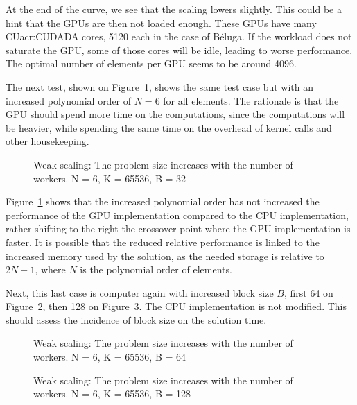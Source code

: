 At the end of the curve, we see that the scaling lowers slightly. This could be a hint that the GPUs
are then not loaded enough. These GPUs have many CU\acrshort{acr:CUDA}DA cores, 5120 each in the
case of Béluga. If the workload does not saturate the GPU, some of those cores will be idle, leading
to worse performance. The optimal number of elements per GPU seems to be around 4096.

The next test, shown on Figure~\ref{fig:strong_scaling_N6_W32}, shows the same test case but with an
increased polynomial order of $N = 6$ for all elements. The rationale is that the GPU should spend
more time on the computations, since the computations will be heavier, while spending the same time
on the overhead of kernel calls and other housekeeping.

\begin{figure}[H]
	\centering
	
	\caption{Weak scaling: The problem size increases with the number of workers. N = 6, K = 65536, B = 32}
	\label{fig:strong_scaling_N6_W32}
\end{figure}

Figure~\ref{fig:strong_scaling_N6_W32} shows that the increased polynomial order has not increased
the performance of the GPU implementation compared to the CPU implementation, rather shifting to the
right the crossover point where the GPU implementation is faster. It is possible that the reduced
relative performance is linked to the increased memory used by the solution, as the needed storage
is relative to $2 N + 1$, where $N$ is the polynomial order of elements.

Next, this last case is computer again with increased block size $B$, first 64 on
Figure~\ref{fig:strong_scaling_N6_W64}, then 128 on Figure~\ref{fig:strong_scaling_N6_W128}. The CPU
implementation is not modified. This should assess the incidence of block size on the solution time.

\begin{figure}[H]
	\centering
	
	\caption{Weak scaling: The problem size increases with the number of workers. N = 6, K = 65536, B = 64}
	\label{fig:strong_scaling_N6_W64}
\end{figure}

\begin{figure}[H]
	\centering
	
	\caption{Weak scaling: The problem size increases with the number of workers. N = 6, K = 65536, B = 128}
	\label{fig:strong_scaling_N6_W128}
\end{figure}

